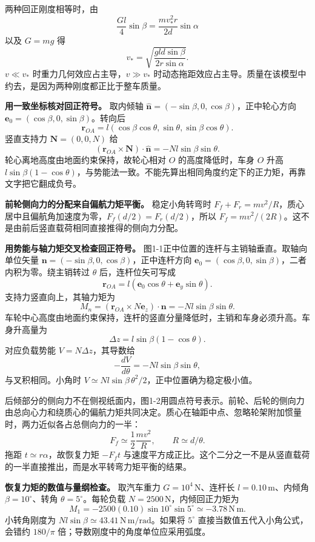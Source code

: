 \documentclass[12pt,a4paper,UTF8]{ctexart}
\begin{document}
两种回正刚度相等时，由 \[
\frac{Gl}{4}\sin\beta
=\frac{mv_*^2r}{2d}\sin\alpha
\] 以及 \(G=mg\) 得 \[
\boxed{
v_*=\sqrt{\frac{gld\sin\beta}{2r\sin\alpha}}
}.
\] \(v\ll v_*\) 时重力几何效应占主导，\(v\gg v_*\)
时动态拖距效应占主导。质量在该模型中约去，是因为两种刚度都正比于整车质量。

\textbf{用一致坐标核对回正符号。} 取内倾轴
\(\hat{\bm n}=(-\sin\beta,0,\cos\beta)\)，正中轮心方向
\(\bm e_0=(\cos\beta,0,\sin\beta)\)。转向后 \[
\bm r_{OA}=l(\cos\beta\cos\theta,\sin\theta,\sin\beta\cos\theta).
\] 竖直支持力 \(\bm N=(0,0,N)\) 给 \[
(\bm r_{OA}\times\bm N)\cdot\hat{\bm n}
=-Nl\sin\beta\sin\theta.
\] 轮心离地高度由地面约束保持，故轮心相对 \(O\) 的高度降低时，车身 \(O\)
升高
\(l\sin\beta(1-\cos\theta)\)，与势能法一致。不能先算出相同角度约定下的正力矩，再靠文字把它翻成负号。

\textbf{前轮侧向力的分配来自偏航力矩平衡。} 稳定小角转弯时
\(F_f+F_r=mv^2/R\)，质心居中且偏航角加速度为零，\(F_f(d/2)=F_r(d/2)\)，所以
\(F_f=mv^2/(2R)\)。这不是由前后竖直载荷相同直接推得的侧向力分配。

\textbf{用势能与轴力矩交叉检查回正符号。}
图1-1正中位置的连杆与主销轴垂直。取轴向单位矢量
\(\bm n=(-\sin\beta,0,\cos\beta)\)，正中连杆方向
\(\bm e_0=(\cos\beta,0,\sin\beta)\)，二者内积为零。绕主销转过 \(\theta\)
后，连杆位矢可写成 \[
\bm r_{OA}=l(\bm e_0\cos\theta+\bm e_y\sin\theta).
\] 支持力竖直向上，其轴力矩为 \[
M_n=(\bm r_{OA}\times N\bm e_z)\cdot\bm n
=-Nl\sin\beta\sin\theta.
\]
车轮中心高度由地面约束保持，连杆的竖直分量降低时，主销和车身必须升高。车身升高量为
\[
\Delta z=l\sin\beta(1-\cos\theta).
\] 对应负载势能 \(V=N\Delta z\)，其导数给 \[
-\frac{dV}{d\theta}=-Nl\sin\beta\sin\theta,
\] 与叉积相同。小角时
\(V\simeq Nl\sin\beta\,\theta^2/2\)，正中位置确为稳定极小值。

后倾部分的侧向力不在侧视纸面内，图1-2用圆点符号表示。前轮、后轮的侧向力由总向心力和绕质心的偏航力矩共同决定。质心在轴距中点、忽略轮架附加惯量时，两力近似各占总侧向力的一半：
\[
F_f\simeq\frac12\frac{mv^2}{R},\qquad R\simeq d/\theta.
\] 拖距 \(t\simeq r\alpha\)，故恢复力矩 \(-F_ft\)
与速度平方成正比。这个二分之一不是从竖直载荷的一半直接推出，而是水平转弯力矩平衡的结果。

\textbf{恢复力矩的数值与量纲检查。} 取汽车重力
\(G=10^4\,\mathrm N\)、连杆长 \(l=0.10\,\mathrm m\)、内倾角
\(\beta=10^\circ\)、转角 \(\theta=5^\circ\)。每轮负载
\(N=2500\,\mathrm N\)，内倾回正力矩为 \[
M_1=-2500(0.10)\sin10^\circ\sin5^\circ\simeq-3.78\,\mathrm{N\,m}.
\] 小转角刚度为 \(Nl\sin\beta\simeq43.41\,\mathrm{N\,m/rad}\)。如果将
\(5^\circ\) 直接当数值五代入小角公式，会错约 \(180/\pi\)
倍；导数刚度中的角度单位应采用弧度。
\end{document}
